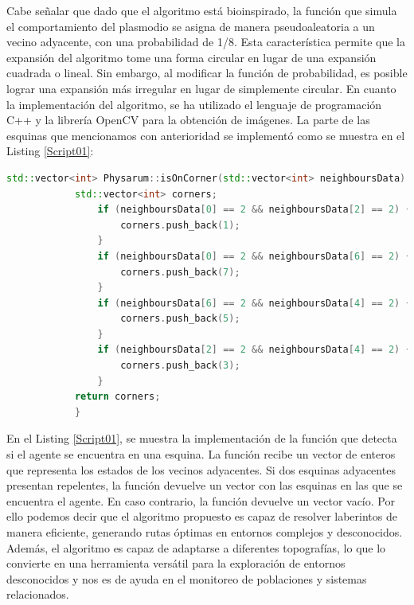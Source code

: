         Cabe se\~nalar que dado que el algoritmo est\'a bioinspirado, la funci\'on que simula el comportamiento del plasmodio 
            se asigna de manera pseudoaleatoria a un vecino adyacente, con una probabilidad de 1/8. Esta caracter\'istica permite 
            que la expansi\'on del algoritmo tome una forma circular en lugar de una expansi\'on cuadrada o lineal. Sin embargo, al 
            modificar la funci\'on de probabilidad, es posible lograr una expansi\'on m\'as irregular en lugar de simplemente circular.
        \clearpage
        En cuanto la implementaci\'on del algoritmo, se ha utilizado el lenguaje de programaci\'on C++ y la librer\'ia OpenCV para la 
            obtenci\'on de im\'agenes. La parte de las esquinas que mencionamos con anterioridad se implement\'o como se muestra en el Listing \ref{Script01}: 
        \begin{lstlisting}[language={C++}, caption={Implementaci\'on del problema de las esquinas}, label={Script01}]
            std::vector<int> Physarum::isOnCorner(std::vector<int> neighboursData) {
            std::vector<int> corners;
                if (neighboursData[0] == 2 && neighboursData[2] == 2) {
                    corners.push_back(1);
                }
                if (neighboursData[0] == 2 && neighboursData[6] == 2) {
                    corners.push_back(7);
                }
                if (neighboursData[6] == 2 && neighboursData[4] == 2) {
                    corners.push_back(5);
                }
                if (neighboursData[2] == 2 && neighboursData[4] == 2) {
                    corners.push_back(3);
                }
            return corners;
            }
        \end{lstlisting}
        En el Listing \ref{Script01}, se muestra la implementaci\'on de la funci\'on que detecta si el agente se encuentra en una esquina. 
            La funci\'on recibe un vector de enteros que representa los estados de los vecinos adyacentes. Si dos esquinas adyacentes 
            presentan repelentes, la funci\'on devuelve un vector con las esquinas en las que se encuentra el agente. 
            En caso contrario, la funci\'on devuelve un vector vac\'io.
        \vskip 0.5cm
        Por ello podemos decir que el algoritmo propuesto es capaz de resolver laberintos de manera eficiente, 
            generando rutas \'optimas en entornos complejos y desconocidos. Adem\'as, el algoritmo es capaz de 
            adaptarse a diferentes topograf\'ias, lo que lo convierte en una herramienta vers\'atil para la exploraci\'on 
            de entornos desconocidos y nos es de ayuda en el monitoreo de poblaciones y sistemas relacionados.
        \vskip 0.5cm
        
        
        
        
        
        
        
